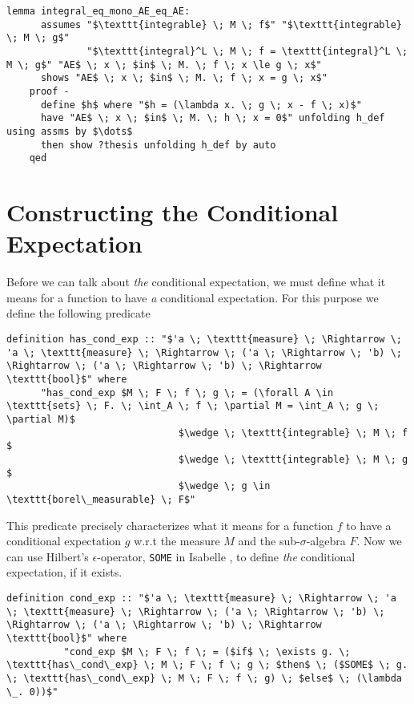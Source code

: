 \begin{isacorollary}
{\small
	\begin{lstlisting}[style=isabelle]
	lemma integral_eq_mono_AE_eq_AE:
	  assumes "$\texttt{integrable} \; M \; f$" "$\texttt{integrable} \; M \; g$" 
			  "$\texttt{integral}^L \; M \; f = \texttt{integral}^L \; M \; g$" "AE$ \; x \; $in$ \; M. \; f \; x \le g \; x$" 
	  shows "AE$ \; x \; $in$ \; M. \; f \; x = g \; x$"
	proof -
	  define $h$ where "$h = (\lambda x. \; g \; x - f \; x)$"
	  have "AE$ \; x \; $in$ \; M. \; h \; x = 0$" unfolding h_def using assms by $\dots$
	  then show ?thesis unfolding h_def by auto
	qed
	\end{lstlisting}
}
\end{isacorollary}

\section{Constructing the Conditional Expectation}

Before we can talk about \textit{the} conditional expectation, we must define what it means for a function to have \textit{a} conditional expectation. For this purpose we define the following predicate

\begin{isadefinition}
{\small
\begin{lstlisting}[style=isabelle]
	definition has_cond_exp :: "$'a \; \texttt{measure} \; \Rightarrow \; 'a \; \texttt{measure} \; \Rightarrow \; ('a \; \Rightarrow \; 'b) \; \Rightarrow \; ('a \; \Rightarrow \; 'b) \; \Rightarrow \texttt{bool}$" where 
	  "has_cond_exp $M \; F \; f \; g \; = (\forall A \in \texttt{sets} \; F. \; \int_A \; f \; \partial M = \int_A \; g \; \partial M)$
							  $\wedge \; \texttt{integrable} \; M \; f $
							  $\wedge \; \texttt{integrable} \; M \; g $
							  $\wedge \; g \in \texttt{borel\_measurable} \; F$"
\end{lstlisting}
}
\end{isadefinition}


This predicate precisely characterizes what it means for a function $f$ to have a conditional expectation $g$ w.r.t the measure $M$ and the sub-$\sigma$-algebra $F$. Now we can use Hilbert's $\epsilon$-operator, \lstinline[language=isabelle]{SOME} in Isabelle \cite{Nipkow-Paulson-Wenzel:2002}, to define \textit{the} conditional expectation, if it exists.


\begin{isadefinition}
{\small
	\begin{lstlisting}[style=isabelle]
		definition cond_exp :: "$'a \; \texttt{measure} \; \Rightarrow \; 'a \; \texttt{measure} \; \Rightarrow \; ('a \; \Rightarrow \; 'b) \; \Rightarrow \; ('a \; \Rightarrow \; 'b) \; \Rightarrow \texttt{bool}$" where 
		  "cond_exp $M \; F \; f \; = ($if$ \; \exists g. \; \texttt{has\_cond\_exp} \; M \; F \; f \; g \; $then$ \; ($SOME$ \; g. \; \texttt{has\_cond\_exp} \; M \; F \; f \; g) \; $else$ \; (\lambda \_. 0))$"
	\end{lstlisting}
}
\end{isadefinition}

